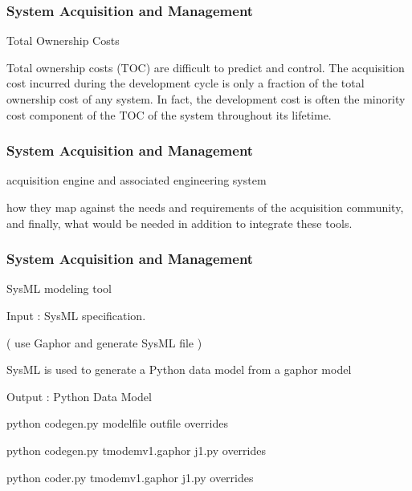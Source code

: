 \newpage
\begin{frame}
\frametitle{ System Acquisition and Management }
\begin{block}{Total Ownership Costs  }

Total ownership costs (TOC) are difficult to predict and control. The acquisition cost
incurred during the development cycle is only a fraction of the total ownership cost of any
system. In fact, the development cost is often the minority cost component of the TOC of the
system throughout its lifetime.


\end{block}
\end{frame}

\newpage
\begin{frame}
\frametitle{ System Acquisition and Management }
\begin{block}{acquisition engine and associated engineering system }

how they map against the needs and requirements of the acquisition community, and
finally, what would be needed in addition to integrate these tools.


\end{block}
\end{frame}


\newpage
\begin{frame}
\frametitle{ System Acquisition and Management }
\begin{block}{SysML modeling tool }

 Input : SysML specification.
 
 ( use Gaphor and generate SysML file )
 
SysML is used to 
 generate a Python data model from a gaphor model

 Output : Python Data Model

 python codegen.py modelfile outfile overrides

  python codegen.py tmodemv1.gaphor  j1.py overrides

  python coder.py tmodemv1.gaphor  j1.py overrides

\end{block}
\end{frame}
